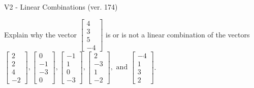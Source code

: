 \begin{exercise}
  \begin{exerciseTitle}V2 - Linear Combinations (ver. 174)\end{exerciseTitle}
  \begin{exerciseStatement}
    Explain why the vector \(\left[\begin{array}{c}
4 \\
3 \\
5 \\
-4
\end{array}\right]\)  is or is not a linear 
	combination of the vectors \(\left[\begin{array}{c}
2 \\
2 \\
4 \\
-2
\end{array}\right] , \left[\begin{array}{c}
0 \\
-1 \\
-3 \\
0
\end{array}\right] , \left[\begin{array}{c}
-1 \\
1 \\
0 \\
-3
\end{array}\right] , \left[\begin{array}{c}
2 \\
-3 \\
1 \\
-2
\end{array}\right] , \text{ and } \left[\begin{array}{c}
-4 \\
1 \\
3 \\
2
\end{array}\right]\).
	



\end{exerciseStatement}
\end{exercise}
